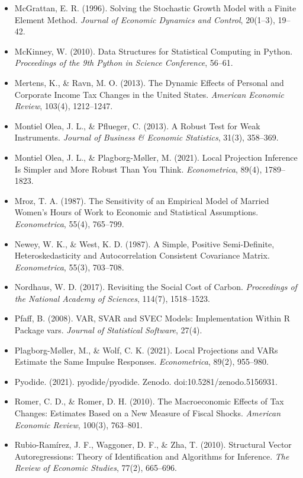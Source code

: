 \documentclass[11pt,letterpaper]{article}
\renewcommand{\_}{\pmunderscore\allowbreak}
\begin{document}
\begin{itemize}
\item
  McGrattan, E. R. (1996). Solving the Stochastic Growth Model with a Finite Element Method. \emph{Journal of Economic Dynamics and Control}, 20(1--3), 19--42.
\item
  McKinney, W. (2010). Data Structures for Statistical Computing in Python. \emph{Proceedings of the 9th Python in Science Conference}, 56--61.
\item
  Mertens, K., \& Ravn, M. O. (2013). The Dynamic Effects of Personal and Corporate Income Tax Changes in the United States. \emph{American Economic Review}, 103(4), 1212--1247.
\item
  Montiel Olea, J. L., \& Pflueger, C. (2013). A Robust Test for Weak Instruments. \emph{Journal of Business \& Economic Statistics}, 31(3), 358--369.
\item
  Montiel Olea, J. L., \& Plagborg-Møller, M. (2021). Local Projection Inference Is Simpler and More Robust Than You Think. \emph{Econometrica}, 89(4), 1789--1823.
\item
  Mroz, T. A. (1987). The Sensitivity of an Empirical Model of Married Women's Hours of Work to Economic and Statistical Assumptions. \emph{Econometrica}, 55(4), 765--799.
\item
  Newey, W. K., \& West, K. D. (1987). A Simple, Positive Semi-Definite, Heteroskedasticity and Autocorrelation Consistent Covariance Matrix. \emph{Econometrica}, 55(3), 703--708.
\item
  Nordhaus, W. D. (2017). Revisiting the Social Cost of Carbon. \emph{Proceedings of the National Academy of Sciences}, 114(7), 1518--1523.
\item
  Pfaff, B. (2008). VAR, SVAR and SVEC Models: Implementation Within R Package vars. \emph{Journal of Statistical Software}, 27(4).
\item
  Plagborg-Møller, M., \& Wolf, C. K. (2021). Local Projections and VARs Estimate the Same Impulse Responses. \emph{Econometrica}, 89(2), 955--980.
\item
  Pyodide. (2021). pyodide/pyodide. Zenodo. doi:10.5281/zenodo.5156931.
\item
  Romer, C. D., \& Romer, D. H. (2010). The Macroeconomic Effects of Tax Changes: Estimates Based on a New Measure of Fiscal Shocks. \emph{American Economic Review}, 100(3), 763--801.
\item
  Rubio-Ramírez, J. F., Waggoner, D. F., \& Zha, T. (2010). Structural Vector Autoregressions: Theory of Identification and Algorithms for Inference. \emph{The Review of Economic Studies}, 77(2), 665--696.

\end{itemize}
\end{document}
